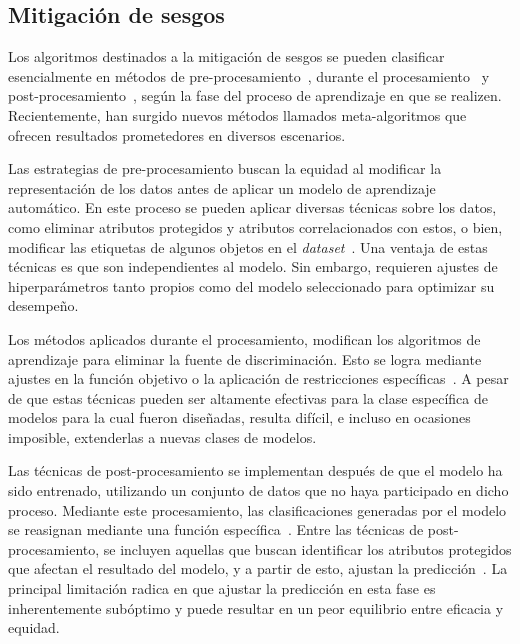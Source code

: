 \subsection{Mitigaci\'on de sesgos}

Los algoritmos destinados a la mitigaci\'on de sesgos se pueden clasificar esencialmente en m\'etodos de 
pre-procesamiento~\parencite{osti_10182459}, durante el procesamiento~\parencite{ml_in_admissions} y 
post-procesamiento~\parencite{compas}, seg\'un la fase del proceso de aprendizaje en que se realizen. Recientemente, 
han surgido nuevos m\'etodos llamados meta-algoritmos que ofrecen resultados prometedores en diversos escenarios.

Las estrategias de pre-procesamiento buscan la equidad al modificar la representaci\'on de los datos antes de aplicar un modelo de 
aprendizaje autom\'atico. En este proceso se pueden aplicar diversas t\'ecnicas sobre los datos, como eliminar atributos protegidos 
y atributos correlacionados con estos, o bien, modificar las etiquetas de algunos objetos en el \emph{dataset}~\parencite{preproc}. 
Una ventaja de estas t\'ecnicas es que son independientes al modelo. Sin embargo, requieren ajustes de hiperpar\'ametros tanto 
propios como del modelo seleccionado para optimizar su desempe\~no.

Los m\'etodos aplicados durante el procesamiento, modifican los algoritmos de aprendizaje para eliminar la fuente de discriminaci\'on. Esto se 
logra mediante ajustes en la funci\'on objetivo o la aplicaci\'on de restricciones espec\'ificas~\parencite{donini2020empirical,zafar17a}. A pesar de 
que estas t\'ecnicas pueden ser altamente efectivas para la clase espec\'ifica de modelos para la cual fueron dise\~nadas, resulta dif\'icil, e 
incluso en ocasiones imposible, extenderlas a nuevas clases de modelos.

Las t\'ecnicas de post-procesamiento se implementan despu\'es de que el modelo ha sido entrenado, utilizando un conjunto de datos que no haya
participado en dicho proceso. Mediante este procesamiento, las clasificaciones generadas por el modelo se reasignan mediante una funci\'on 
espec\'ifica~\parencite{d_Alessandro_2017}.
Entre las t\'ecnicas de post-procesamiento, se incluyen aquellas que buscan identificar los atributos protegidos que afectan el resultado del 
modelo, y a partir de esto, ajustan la predicci\'on~\parencite{seymour2018bias}. La principal limitaci\'on radica en que ajustar la predicci\'on 
en esta fase es inherentemente sub\'optimo y puede resultar en un peor equilibrio entre eficacia y equidad.

